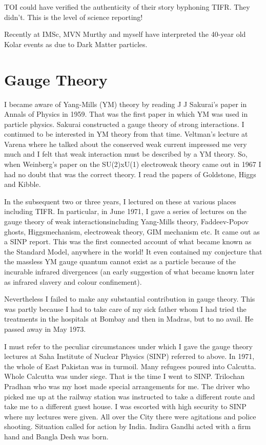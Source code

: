 TOI could have verified the authenticity of their story by\break phoning TIFR. 
They didn't. This is the level of science reporting!

Recently at IMSc, MVN Murthy and myself have interpreted the 40-year old 
Kolar events as due to Dark Matter particles.
\newpage

\section*{Gauge Theory}

I became aware of Yang-Mills (YM) theory by reading J J Sakurai's paper 
in Annals of Physics in 1959. That was the first paper in which YM was 
used in particle physics. Sakurai constructed a gauge theory of strong 
interactions. I continued to be intere\-sted in YM theory from that time. 
Veltman's lecture at Varena where he talked about the conserved weak 
current impressed me very much and I felt that weak interaction must be 
described by a YM theory. So, when Weinberg's paper on the SU(2)xU(1)\break 
electroweak theory came out in 1967 I had no doubt that was the correct 
theory. I read the papers of Goldstone, Higgs and Kibble.

In the subsequent two or three years, I lectured on these at various 
places including TIFR. In particular, in June 1971, I gave a series of 
lectures on the gauge theory of weak interactions\break including Yang-Mills 
theory, Faddeev-Popov ghosts, Higgs\break mechanism, electroweak theory, GIM 
mechanism etc. It came out as a SINP report. This was the first 
connected account of what became known as the Standard Model, anywhere 
in the world! It even contained my conjecture that the massless YM gauge\break 
quantum cannot exist as a particle because of the incurable infra\-red 
divergences (an early suggestion of what became known later as infrared 
slavery and colour confinement).

Nevertheless I failed to make any substantial contribution in gauge 
theory. This was partly because I had to take care of my sick father 
whom I had tried the treatments in the hospitals at Bombay and then in 
Madras, but to no avail. He passed away in May 1973.

I must refer to the peculiar circumstances under which I gave the gauge 
theory lectures at Saha Institute of Nuclear Physics (SINP) referred 
to above. In 1971, the whole of East Pakistan was in turmoil. Many 
refugees poured into Calcutta. Whole Calcutta was under siege. That is 
the time I went to SINP. Trilochan Pradhan who was my host made special 
arrangements for me. The driver who picked me up at the railway station 
was instructed to take a different route and take me to a different 
guest house. I was escorted with high security to SINP where my lectures 
were given. All over the City there were agitations and police shooting. 
Situation called for action by India. Indira Gandhi acted with a firm 
hand and Bangla Desh was born.
  
